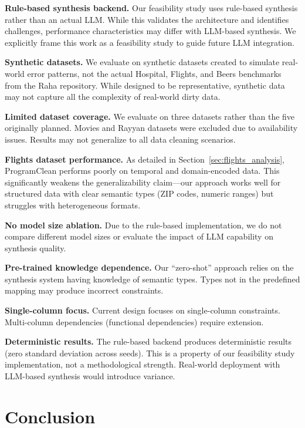 \documentclass{article}
\begin{document}
\textbf{Rule-based synthesis backend.} Our feasibility study uses rule-based synthesis rather than an actual LLM. While this validates the architecture and identifies challenges, performance characteristics may differ with LLM-based synthesis. We explicitly frame this work as a feasibility study to guide future LLM integration.

\textbf{Synthetic datasets.} We evaluate on synthetic datasets created to simulate real-world error patterns, not the actual Hospital, Flights, and Beers benchmarks from the Raha repository. While designed to be representative, synthetic data may not capture all the complexity of real-world dirty data.

\textbf{Limited dataset coverage.} We evaluate on three datasets rather than the five originally planned. Movies and Rayyan datasets were excluded due to availability issues. Results may not generalize to all data cleaning scenarios.

\textbf{Flights dataset performance.} As detailed in Section~\ref{sec:flights_analysis}, ProgramClean performs poorly on temporal and domain-encoded data. This significantly weakens the generalizability claim---our approach works well for structured data with clear semantic types (ZIP codes, numeric ranges) but struggles with heterogeneous formats.

\textbf{No model size ablation.} Due to the rule-based implementation, we do not compare different model sizes or evaluate the impact of LLM capability on synthesis quality.

\textbf{Pre-trained knowledge dependence.} Our ``zero-shot'' approach relies on the synthesis system having knowledge of semantic types. Types not in the predefined mapping may produce incorrect constraints.

\textbf{Single-column focus.} Current design focuses on single-column constraints. Multi-column dependencies (functional dependencies) require extension.

\textbf{Deterministic results.} The rule-based backend produces deterministic results (zero standard deviation across seeds). This is a property of our feasibility study implementation, not a methodological strength. Real-world deployment with LLM-based synthesis would introduce variance.

\section{Conclusion}
\label{sec:conclusion}
\end{document}
